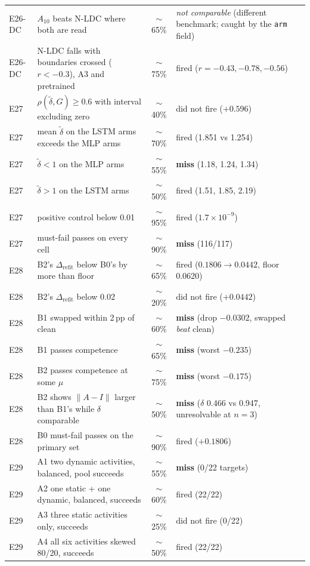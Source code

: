 \begin{center}
\begin{tabular}{@{}llcl@{}}
E26-DC & $A_{10}$ beats N-LDC where both are read & $\sim$65\% & \emph{not comparable} (different benchmark; caught by the \texttt{arm} field) \\
E26-DC & N-LDC falls with boundaries crossed ($r<-0.3$), A3 and pretrained & $\sim$75\% & fired ($r=-0.43,-0.78,-0.56$) \\
E27 & $\rho(\tilde\delta, G) \ge 0.6$ with interval excluding zero & $\sim$40\% & did not fire ($+0.596$) \\
E27 & mean $\tilde\delta$ on the LSTM arms exceeds the MLP arms & $\sim$70\% & fired (1.851 vs 1.254) \\
E27 & $\tilde\delta < 1$ on the MLP arms & $\sim$55\% & \textbf{miss} (1.18, 1.24, 1.34) \\
E27 & $\tilde\delta > 1$ on the LSTM arms & $\sim$50\% & fired (1.51, 1.85, 2.19) \\
E27 & positive control below 0.01 & $\sim$95\% & fired ($1.7\times10^{-9}$) \\
E27 & must-fail passes on every cell & $\sim$90\% & \textbf{miss} (116/117) \\
E28 & B2's $\Delta_{\mathrm{refit}}$ below B0's by more than floor & $\sim$65\% & fired ($0.1806 \to 0.0442$, floor 0.0620) \\
E28 & B2's $\Delta_{\mathrm{refit}}$ below 0.02 & $\sim$20\% & did not fire ($+0.0442$) \\
E28 & B1 swapped within 2\,pp of clean & $\sim$60\% & \textbf{miss} (drop $-0.0302$, swapped \emph{beat} clean) \\
E28 & B1 passes competence & $\sim$65\% & \textbf{miss} (worst $-0.235$) \\
E28 & B2 passes competence at some $\mu$ & $\sim$75\% & \textbf{miss} (worst $-0.175$) \\
E28 & B2 shows $\|A-I\|$ larger than B1's while $\delta$ comparable & $\sim$50\% & \textbf{miss} ($\delta$ 0.466 vs 0.947, unresolvable at $n=3$) \\
E28 & B0 must-fail passes on the primary set & $\sim$90\% & fired ($+0.1806$) \\
E29 & A1 two dynamic activities, balanced, pool succeeds & $\sim$55\% & \textbf{miss} (0/22 targets) \\
E29 & A2 one static + one dynamic, balanced, succeeds & $\sim$60\% & fired (22/22) \\
E29 & A3 three static activities only, succeeds & $\sim$25\% & did not fire (0/22) \\
E29 & A4 all six activities skewed 80/20, succeeds & $\sim$50\% & fired (22/22) \\

\end{tabular}
\end{center}
